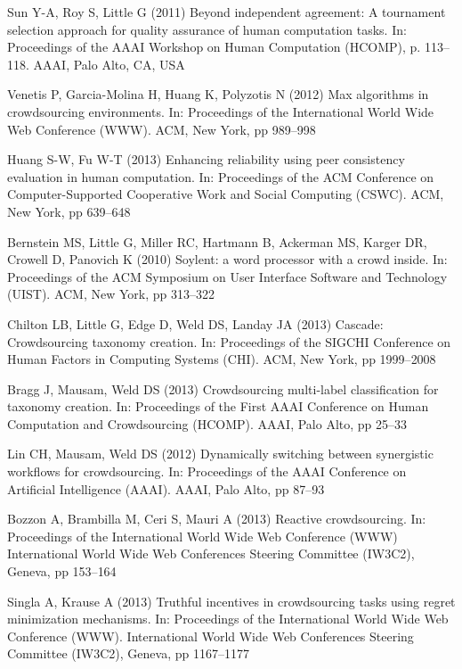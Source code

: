 \documentclass[11pt]{bmc_article_s50}
\begin{document}
\begin{thebibliography}{000}
Sun Y-A,
Roy S,
Little G (2011)
{Beyond independent agreement: A tournament selection approach for
  quality assurance of human computation tasks.}
In: {Proceedings of the AAAI Workshop on Human Computation (HCOMP)},
p. 113--{118}.
{AAAI},
{Palo Alto, CA, USA}

Venetis P,
Garcia-Molina H,
Huang K,
Polyzotis N (2012)
{Max algorithms in crowdsourcing environments}.
In: {Proceedings of the International World Wide Web Conference (WWW)}.
{ACM},
{New York},
pp 989--{998}

Huang S-W,
Fu W-T (2013)
{Enhancing reliability using peer consistency evaluation in human
  computation}.
In: {Proceedings of the ACM Conference on Computer-Supported
  Cooperative Work and Social Computing (CSWC)}.
{ACM},
{New York},
pp 639--{648}

Bernstein MS,
Little G,
Miller RC,
Hartmann B,
Ackerman MS,
Karger DR,
Crowell D,
Panovich K (2010)
{Soylent: a word processor with a crowd inside}.
In: {Proceedings of the ACM Symposium on User Interface Software and
  Technology (UIST)}.
{ACM},
{New York},
pp 313--{322}

Chilton LB,
Little G,
Edge D,
Weld DS,
Landay JA (2013)
{Cascade: Crowdsourcing taxonomy creation}.
In: {Proceedings of the SIGCHI Conference on Human Factors in Computing
  Systems (CHI)}.
{ACM},
{New York},
pp 1999--{2008}

Bragg J,
Mausam,
Weld DS (2013)
{Crowdsourcing multi-label classification for taxonomy creation}.
In: {Proceedings of the First AAAI Conference on Human Computation and
  Crowdsourcing (HCOMP)}.
{AAAI},
{Palo Alto},
pp 25--{33}


Lin CH,
Mausam,
Weld DS (2012)
{Dynamically switching between synergistic workflows for
  crowdsourcing}.
In: {Proceedings of the AAAI Conference on Artificial Intelligence
  (AAAI)}.
{AAAI},
{Palo Alto},
pp 87--{93}


Bozzon A,
Brambilla M,
Ceri S,
Mauri A (2013)
{Reactive crowdsourcing}.
In: {Proceedings of the International World Wide Web Conference (WWW)}
{International World Wide Web Conferences Steering Committee (IW3C2)},
{Geneva},
pp 153--{164}


Singla A,
Krause A (2013)
{Truthful incentives in crowdsourcing tasks using regret minimization
  mechanisms}.
In: {Proceedings of the International World Wide Web Conference (WWW)}.
{International World Wide Web Conferences Steering Committee (IW3C2)},
{Geneva},
pp 1167--{1177}




\end{thebibliography}
\end{document}
